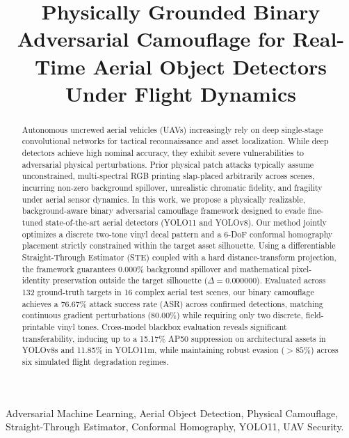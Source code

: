 \documentclass[conference]{IEEEtran}
\begin{document}
\title{Physically Grounded Binary Adversarial Camouflage for Real-Time Aerial Object Detectors Under Flight Dynamics}

\author{
}

\maketitle

\begin{abstract}
Autonomous uncrewed aerial vehicles (UAVs) increasingly rely on deep single-stage convolutional networks for tactical reconnaissance and asset localization. While deep detectors achieve high nominal accuracy, they exhibit severe vulnerabilities to adversarial physical perturbations. Prior physical patch attacks typically assume unconstrained, multi-spectral RGB printing slap-placed arbitrarily across scenes, incurring non-zero background spillover, unrealistic chromatic fidelity, and fragility under aerial sensor dynamics. In this work, we propose a physically realizable, background-aware binary adversarial camouflage framework designed to evade fine-tuned state-of-the-art aerial detectors (YOLO11 and YOLOv8). Our method jointly optimizes a discrete two-tone vinyl decal pattern and a 6-DoF conformal homography placement strictly constrained within the target asset silhouette. Using a differentiable Straight-Through Estimator (STE) coupled with a hard distance-transform projection, the framework guarantees $0.000\%$ background spillover and mathematical pixel-identity preservation outside the target silhouette ($\Delta = 0.000000$). Evaluated across 132 ground-truth targets in 16 complex aerial test scenes, our binary camouflage achieves a 76.67\% attack success rate (ASR) across confirmed detections, matching continuous gradient perturbations (80.00\%) while requiring only two discrete, field-printable vinyl tones. Cross-model blackbox evaluation reveals significant transferability, inducing up to a 15.17\% AP50 suppression on architectural assets in YOLOv8s and 11.85\% in YOLO11m, while maintaining robust evasion ($>85\%$) across six simulated flight degradation regimes.
\end{abstract}

\begin{IEEEkeywords}
Adversarial Machine Learning, Aerial Object Detection, Physical Camouflage, Straight-Through Estimator, Conformal Homography, YOLO11, UAV Security.
\end{IEEEkeywords}
\end{document}
